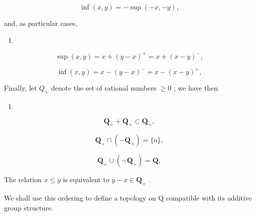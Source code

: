 \[
\inf (x, y) = - \sup (- x, - y),\tag{5}
\]

and, as particular cases,

\begin{enumerate}
\def\labelenumi{(\arabic{enumi})}
\setcounter{enumi}{5}
\tightlist
\item
\end{enumerate}

\[
\sup (x, y) = x + (y - x) ^ {+} = x + (x - y) ^ {-},\tag{6}
\]

\[
\inf (x, y) = x - (y - x) ^ {-} = x - (x - y) ^ {+},\tag{7}
\]

Finally, let \(Q_{+}\) denote the set of rational numbers \(\geqslant0\) ; we have then

\begin{enumerate}
\def\labelenumi{(\arabic{enumi})}
\setcounter{enumi}{7}
\tightlist
\item
\end{enumerate}

\[
\mathbf {Q} _ {+} + \mathbf {Q} _ {+} \subset \mathbf {Q} _ {+},\tag{8}
\]

\[
\mathbf {Q} _ {+} \cap (- \mathbf {Q} _ {+}) = \{\mathrm{o} \},\tag{9}
\]

\[
\mathbf {Q} _ {+} \cup (- \mathbf {Q} _ {+}) = \mathbf {Q},\tag{10}
\]

The relation \(x \leqslant y\) is equivalent to \(y - x \in \mathbf{Q}_{+}\) .

We shall use this ordering to define a topology on Q compatible with its additive group structure.

